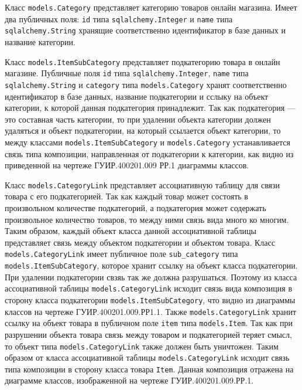 Класс \texttt{models.Category} представляет категорию товаров онлайн магазина. Имеет два публичных поля: \texttt{id} типа \texttt{sqlalchemy.Integer} и \texttt{name} типа \texttt{sqlalchemy.String} хранящие соответственно идентификатор в базе данных и название категории.

Класс \texttt{models.ItemSubCategory} представляет подкатегорию товара в онлайн магазине. Публичные поля \texttt{id} типа \texttt{sqlalchemy.Integer}, \texttt{name} типа \texttt{sqlalchemy.String} и \texttt{category} типа \texttt{models.Category} хранят соответственно идентификатор в базе данных, название подкатегории и сслыку на объект категории, к которой данная подкатегория принадлежит. Так как подкатегория --- это составная часть категории, то при удалении объекта категории должен удаляться и объект подкатегории, на который ссылается объект категории, то между классами \texttt{models.ItemSubCategory} и \texttt{models.Category} устанавливается связь типа композиции, направленная от подкатегории к категории, как видно из приведенной на чертеже ГУИР.400201.009 РР.1 диаграммы классов.

Класс \texttt{models.CategoryLink} представляет ассоциативную таблицу для связи товара с его подкатегорией. Так как каждый товар может состоять в произвольном количестве подкатегорий, а подкатегория может содержать произвольное количество товаров, то между ними связь вида много ко многим. Таким образом, каждый объект класса данной ассоциативной таблицы представляет связь между объектом подкатегории и объектом товара. Класс \texttt{models.CategoryLink} имеет публичное поле \texttt{sub\_category} типа \texttt{models.ItemSubCategory}, которое хранит ссылку на объект класса подкатегории. При удалении подкатегории свзяь так же должна разрушаться. Поэтому из класса ассоциативной таблицы \texttt{models.CategoryLink} исходит связь вида композиция в сторону класса подкатегории \texttt{models.ItemSubCategory}, что видно из диаграммы классов на чертеже ГУИР.400201.009.РР1.1. Также \texttt{models.CategoryLink} хранит ссылку на объект товара в публичном поле \texttt{item} типа \texttt{models.Item}. Так как при разрушении объекта товара связь между товаром и подкатегорией теряет смысл, то объект типа \texttt{models.CategoryLink} также должен быть уничтожен. Таким образом от класса ассоциативной таблицы \texttt{models.CategoryLink} исходит связь типа композиции в сторону класса товара \texttt{Item}. Данная композиция отражена на диаграмме классов, изображенной на чертеже ГУИР.400201.009.РР.1.

